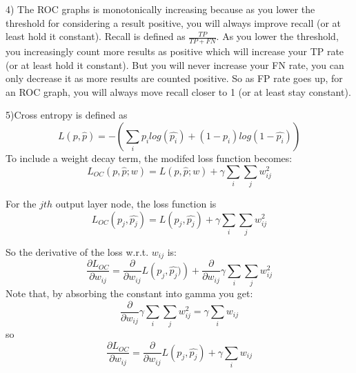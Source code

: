 \documentclass[12pt]{article}
\begin{document}
4) The ROC graphs is monotonically increasing because as you lower the threshold for considering 
a result positive, you will always improve recall (or at least hold it constant). Recall is
defined as $\frac{TP}{TP+FN}$. As you lower the threshold, you increasingly count more 
results as positive which will increase your TP rate (or at least hold it constant). But you 
will never increase your FN rate, you can only decrease it as more results are counted positive. 
So as FP rate goes up, for an ROC graph, you will always move recall closer to 1 (or at least stay 
constant). 

\pagebreak
\setcounter{equation}{0}
5)Cross entropy is defined as 
\begin{equation}
    L(p,\hat{p}) = - \left( \sum_i p_i log\left(\hat{p_i}\right) + (1-p_i)log\left(1-\hat{p_i}\right)\right)
\end{equation}
To include a weight decay term, the modifed loss function becomes: 
\begin{equation}
    L_{OC}(p,\hat{p};w) = L(p,\hat{p};w) + \gamma\sum_i\sum_j w_{ij}^2
\end{equation}


For the $j th$ output layer node, the loss function is
\begin{equation}
    L_{OC}(p_j,\hat{p_j}) = L\left(p_j,\hat{p_j}\right) + \gamma\sum_i\sum_j w_{ij}^2
\end{equation}

So the derivative of the loss w.r.t. $w_{ij}$ is: 
\begin{equation}
    \frac{\partial L_{OC}}{\partial w_{ij}} = \frac{\partial}{\partial w_{ij}}L\left(p_j,\hat{p_j})\right)
    +\frac{\partial}{\partial w_{ij}}\gamma\sum_i\sum_j w_{ij}^2 
\end{equation}
Note that, by absorbing the constant into gamma you get: 
\begin{equation}
    \frac{\partial}{\partial w_{ij}}\gamma\sum_i\sum_j w_{ij}^2 = \gamma \sum_i w_{ij}
\end{equation}
so 
\begin{equation}
    \frac{\partial L_{OC}}{\partial w_{ij}} = \frac{\partial}{\partial w_{ij}}L\left(p_j,\hat{p_j}\right) + \gamma \sum_i w_{ij}
\end{equation}
\end{document}

